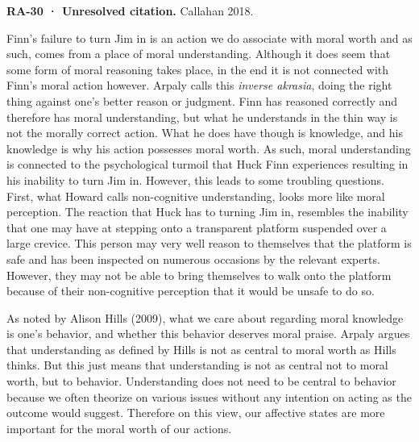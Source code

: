 \documentclass[
  letterpaper,
  DIV=11,
  numbers=noendperiod]{scrartcl}
\theoremstyle{remark}
\begin{document}
\begin{tcolorbox}[enhanced jigsaw, arc=.35mm, bottomrule=.15mm, bottomtitle=1mm, breakable, colback=white, colbacktitle=quarto-callout-warning-color!10!white, colframe=quarto-callout-warning-color-frame, coltitle=black, left=2mm, leftrule=.75mm, opacityback=0, opacitybacktitle=0.6, rightrule=.15mm, title=\textcolor{quarto-callout-warning-color}{\faExclamationTriangle}\hspace{0.5em}{Warning}, titlerule=0mm, toprule=.15mm, toptitle=1mm]

\textbf{RA-30 · Unresolved citation.} Callahan 2018.

\end{tcolorbox}

Finn's failure to turn Jim in is an action we do associate with moral
worth and as such, comes from a place of moral understanding. Although
it does seem that some form of moral reasoning takes place, in the end
it is not connected with Finn's moral action however. Arpaly calls this
\emph{inverse akrasia}, doing the right thing against one's better
reason or judgment. Finn has reasoned correctly and therefore has moral
understanding, but what he understands in the thin way is not the
morally correct action. What he does have though is knowledge, and his
knowledge is why his action possesses moral worth. As such, moral
understanding is connected to the psychological turmoil that Huck Finn
experiences resulting in his inability to turn Jim in. However, this
leads to some troubling questions. First, what Howard calls
non-cognitive understanding, looks more like moral perception. The
reaction that Huck has to turning Jim in, resembles the inability that
one may have at stepping onto a transparent platform suspended over a
large crevice. This person may very well reason to themselves that the
platform is safe and has been inspected on numerous occasions by the
relevant experts. However, they may not be able to bring themselves to
walk onto the platform because of their non-cognitive perception that it
would be unsafe to do so.

As noted by Alison Hills (2009), what we care about regarding moral
knowledge is one's behavior, and whether this behavior deserves moral
praise. Arpaly argues that understanding as defined by Hills is not as
central to moral worth as Hills thinks. But this just means that
understanding is not as central not to moral worth, but to behavior.
Understanding does not need to be central to behavior because we often
theorize on various issues without any intention on acting as the
outcome would suggest. Therefore on this view, our affective states are
more important for the moral worth of our actions.
\end{document}
